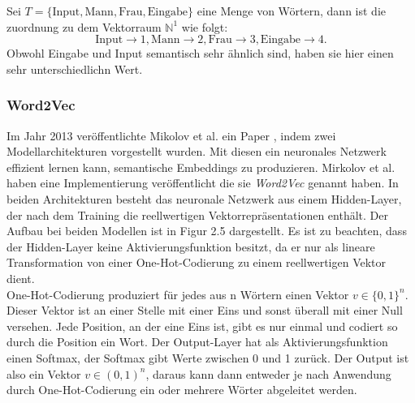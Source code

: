 \documentclass[12pt,letterpaper,ngerman]{article}
\begin{document}
\begin{example}
  Sei $T = \{\text{Input}, \text{Mann}, \text{Frau},
   \text{Eingabe}\}$ eine Menge von Wörtern, dann ist die zuordnung
  zu dem Vektorraum $\mathbb{N}^1$ wie folgt:
  \[
    \text{Input} \to 1, 
    \text{Mann} \to 2, 
    \text{Frau} \to 3,
    \text{Eingabe} \to 4.
  \]
  Obwohl Eingabe und Input semantisch sehr ähnlich sind, haben sie hier
  einen sehr unterschiedlichn Wert.
\end{example}
\subsubsection{Word2Vec}
Im Jahr 2013 veröffentlichte Mikolov et al. ein Paper 
\cite{mikolov2013efficientestimationwordrepresentations},
indem zwei Modellarchitekturen vorgestellt wurden. Mit diesen ein
neuronales Netzwerk effizient lernen kann, semantische Embeddings
zu produzieren.
Mirkolov et al. haben eine Implementierung veröffentlicht die sie 
\textit{Word2Vec} genannt haben.
In beiden Architekturen besteht das neuronale Netzwerk aus einem 
Hidden-Layer, der nach dem Training die reellwertigen 
Vektorrepräsentationen enthält.
Der Aufbau bei beiden Modellen ist in Figur 2.5 dargestellt.
Es ist zu beachten, dass der Hidden-Layer keine Aktivierungsfunktion 
besitzt, da er nur als lineare Transformation von einer 
One-Hot-Codierung zu einem reellwertigen Vektor dient.\\

One-Hot-Codierung produziert für jedes aus n Wörtern einen Vektor
$v \in \{0,1\}^n$. Dieser Vektor ist an einer Stelle mit einer Eins
und sonst überall mit einer Null versehen. Jede Position, an der eine
Eins ist, gibt es nur einmal und codiert so durch die Position ein Wort.
Der Output-Layer hat als Aktivierungsfunktion einen Softmax, der 
Softmax gibt Werte zwischen 0 und 1 zurück. Der Output ist also ein 
Vektor $v \in (0,1)^n$, daraus kann dann entweder je nach Anwendung 
durch One-Hot-Codierung ein oder mehrere Wörter abgeleitet werden.
\end{document}
